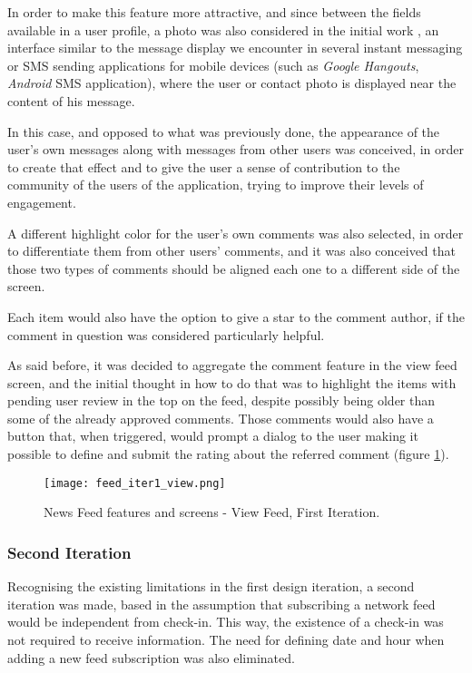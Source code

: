 In order to make this feature more attractive, and since between the fields available in a user profile, a photo was also considered in the initial work \cite{kn:eSG12}, an interface similar to the message display we encounter in several instant messaging or SMS sending applications for mobile devices (such as \emph{Google Hangouts}, \emph{Android} SMS application), where the user or contact photo is displayed near the content of his message.

In this case, and opposed to what was previously done, the appearance of the user's own messages along with messages from other users was conceived, in order to create that effect and to give the user a sense of contribution to the community of the users of the application, trying to improve their levels of engagement.

A different highlight color for the user's own comments was also selected, in order to differentiate them from other users' comments, and it was also conceived that those two types of comments should be aligned each one to a different side of the screen.

Each item would also have the option to give a star to the comment author, if the comment in question was considered particularly helpful. 


As said before, it was decided to aggregate the comment feature in the view feed screen, and the initial thought in how to do that was to highlight the items with pending user review in the top on the feed, despite possibly being older than some of the already approved comments. Those comments would also have a button that, when triggered, would prompt a dialog to the user making it possible to define and submit the rating about the referred comment (figure \ref{fig:feed_iter1_view}).

\begin{figure}[htb]
  \begin{center}
    \leavevmode
    \texttt{[image: feed\_iter1\_view.png]}
    \caption{News Feed features and screens - View Feed, First Iteration.}
    \label{fig:feed_iter1_view}
  \end{center}
\end{figure}




\subsubsection{Second Iteration}

Recognising the existing limitations in the first design iteration,  a second iteration was made, based in the assumption that subscribing a network feed would be independent from check-in. This way, the existence of a check-in was not required to receive information. The need for defining date and hour when adding a new feed subscription was also eliminated.

